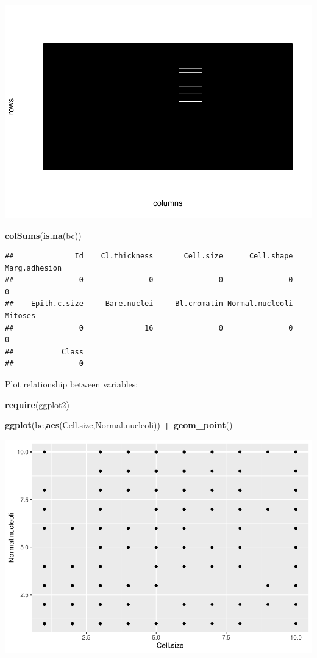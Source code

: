 \documentclass[
]{book}
\newenvironment{Shaded}{\begin{snugshade}}{\end{snugshade}}
\newcommand{\FunctionTok}[1]{\textcolor[rgb]{0.13,0.29,0.53}{\textbf{#1}}}
\newcommand{\NormalTok}[1]{#1}
\newcommand{\SpecialCharTok}[1]{\textcolor[rgb]{0.81,0.36,0.00}{\textbf{#1}}}
\begin{document}
\includegraphics{_main_files/figure-latex/unnamed-chunk-79-1.pdf}

\begin{Shaded}
\begin{Highlighting}[]
\FunctionTok{colSums}\NormalTok{(}\FunctionTok{is.na}\NormalTok{(bc))}
\end{Highlighting}
\end{Shaded}

\begin{verbatim}
##              Id    Cl.thickness       Cell.size      Cell.shape   Marg.adhesion 
##               0               0               0               0               0 
##    Epith.c.size     Bare.nuclei     Bl.cromatin Normal.nucleoli         Mitoses 
##               0              16               0               0               0 
##           Class 
##               0
\end{verbatim}

Plot relationship between variables:

\begin{Shaded}
\begin{Highlighting}[]
\FunctionTok{require}\NormalTok{(ggplot2)}

\FunctionTok{ggplot}\NormalTok{(bc,}\FunctionTok{aes}\NormalTok{(Cell.size,Normal.nucleoli)) }\SpecialCharTok{+} \FunctionTok{geom\_point}\NormalTok{()}
\end{Highlighting}
\end{Shaded}

\includegraphics{_main_files/figure-latex/unnamed-chunk-81-1.pdf}
\end{document}
